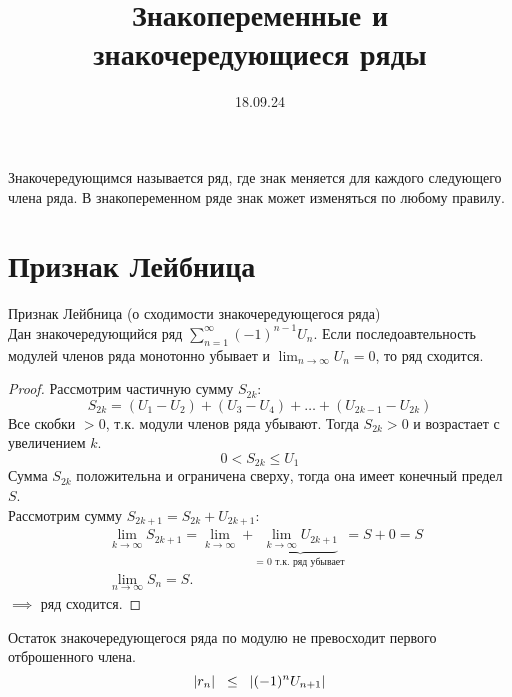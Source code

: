 

\title{Знакопеременные и знакочередующиеся ряды}
\date{18.09.24}


\maketitle
\begin{remark}
    Знакочередующимся называется ряд, где знак меняется 
    для каждого следующего члена ряда. В знакопеременном ряде 
    знак может изменяться по любому правилу.
\end{remark}

\section{Признак Лейбница}
\begin{thm}
    Признак Лейбница (о сходимости знакочередующегося ряда)\\
    Дан знакочередующийся ряд \(\sum_{n=1}^{\infty} (-1)^{n-1} U_{n}\). 
    Если последоавтельность модулей членов ряда монотонно убывает 
    и \(\lim_{n\to\infty} U_{n}=0\), то ряд сходится.
    \begin{proof}
        Рассмотрим частичную сумму \(S_{2k}\):
        \begin{equation}
            S_{2k} = (U_{1} - U_{2}) + (U_{3} - U_{4}) + 
            \dots + (U_{2k - 1} - U_{2k})
        \end{equation}
        Все скобки \(>0\), т.к. модули членов ряда убывают. 
        Тогда \(S_{2k} > 0\) и возрастает с увеличением \(k\).
        \begin{equation}
            0 < S_{2k} \leq U_{1}
        \end{equation}
        Сумма \(S_{2k}\) положительна и ограничена сверху, 
        тогда она имеет конечный предел \(S\). \\
        Рассмотрим сумму \(S_{2k+1} = S_{2k} + U_{2k+1}\):
        \begin{equation}
            \begin{align*}
                &\lim_{k\to\infty} S_{2k+1} = \lim_{k\to\infty} 
                + \underbrace{\lim_{k\to\infty}U_{2k+1}}_{\text{= 0 т.к. ряд убывает}} 
                = S+0= S\\
                &\lim_{n\to\infty}S_{n} = S.
            \end{align*}
        \end{equation}
        \(\implies\) ряд сходится.
    \end{proof}

    \begin{corollary}
        Остаток знакочередующегося ряда по модулю 
        не превосходит первого отброшенного члена.
        \begin{equation}
            |r_{n}| \hspace{0.2cm} \leq \hspace{0.2cm} |(-1)^{n}U_{n+1}|
        \end{equation}
    \end{corollary}
\end{thm}




